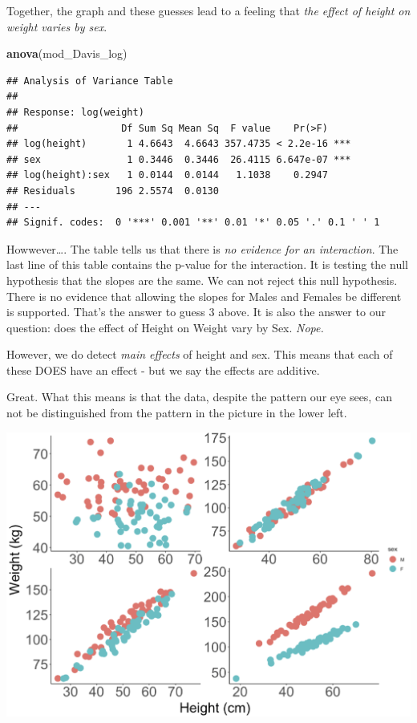 \documentclass[
]{book}
\newenvironment{Shaded}{\begin{snugshade}}{\end{snugshade}}
\newcommand{\FunctionTok}[1]{\textcolor[rgb]{0.13,0.29,0.53}{\textbf{#1}}}
\newcommand{\NormalTok}[1]{#1}
\begin{document}
Together, the graph and these guesses lead to a feeling that \emph{the effect of height on weight varies by sex}.

\begin{Shaded}
\begin{Highlighting}[]
\FunctionTok{anova}\NormalTok{(mod\_Davis\_log)}
\end{Highlighting}
\end{Shaded}

\begin{verbatim}
## Analysis of Variance Table
## 
## Response: log(weight)
##                  Df Sum Sq Mean Sq  F value    Pr(>F)    
## log(height)       1 4.6643  4.6643 357.4735 < 2.2e-16 ***
## sex               1 0.3446  0.3446  26.4115 6.647e-07 ***
## log(height):sex   1 0.0144  0.0144   1.1038    0.2947    
## Residuals       196 2.5574  0.0130                       
## ---
## Signif. codes:  0 '***' 0.001 '**' 0.01 '*' 0.05 '.' 0.1 ' ' 1
\end{verbatim}

Howwever\ldots. The table tells us that there is \emph{no evidence for an interaction}. The last line of this table contains the p-value for the interaction. It is testing the null hypothesis that the slopes are the same. We can not reject this null hypothesis. There is no evidence that allowing the slopes for Males and Females be different is supported. That's the answer to guess 3 above. It is also the answer to our question: does the effect of Height on Weight vary by Sex. \emph{Nope.}

However, we do detect \emph{main effects} of height and sex. This means that each of these DOES have an effect - but we say the effects are additive.

Great. What this means is that the data, despite the pattern our eye sees, can not be distinguished from the pattern in the picture in the lower left.

\includegraphics[width=17.89in]{images/ANCOVA_1}
\end{document}
